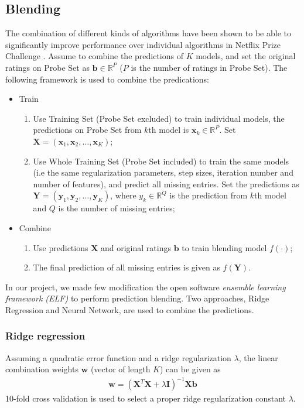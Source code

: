 \documentclass[journal]{IEEEtran}
\begin{document}
\subsection{Blending}
The combination of different kinds of algorithms have been shown to be able to significantly  improve performance over individual algorithms in Netflix Prize Challenge \cite{blend}. Assume to combine the predictions of $K$ models, and set the original ratings on Probe Set as $\mathbf b \in \mathbb R^P$ ($P$ is the number of ratings in Probe Set).  The following framework is used to combine the predications:
\begin{itemize}
\item Train
\begin{enumerate}
\item Use Training Set (Probe Set excluded) to train individual models, the predictions on Probe Set from $k$th model is $\mathbf x_k \in \mathbb R^P$. Set $\mathbf X = (\mathbf x_1, \mathbf x_2, \ldots, \mathbf x_K)$;
\item Use Whole Training Set (Probe Set included) to train the same models (i.e the same regularization parameters, step sizes, iteration number and number of features), and predict all missing entries. Set the predictions as $\mathbf Y = (\mathbf y_1, \mathbf y_2, \ldots, \mathbf y_K)$, where $y_k \in \mathbb R^Q$ is the prediction from $k$th model and $Q$ is the number of missing entries;
\end{enumerate}

\item Combine
\begin{enumerate}
\item Use predictions $\mathbf X$ and original ratings $\mathbf b$  to train blending model $f(\cdot)$;
\item The final prediction of all missing entries is given as $f(\mathbf Y)$.
\end{enumerate}
\end{itemize}

In our project, we made few modification the open software {\it ensemble learning framework (ELF)} \cite{elf} to perform prediction blending. Two approaches, Ridge Regression and Neural Network, are used to combine the predictions.

\subsubsection{Ridge regression}
Assuming a quadratic error function and a ridge regularization $\lambda$, the linear combination weights $\mathbf w$ (vector of length $K$) can be given as
\begin{align*}
\mathbf w = (\mathbf X^T \mathbf X + \lambda \mathbf I)^{-1} \mathbf X \mathbf b
\end{align*}
10-fold cross validation is used to select a proper ridge regularization constant $\lambda$.
\end{document}
